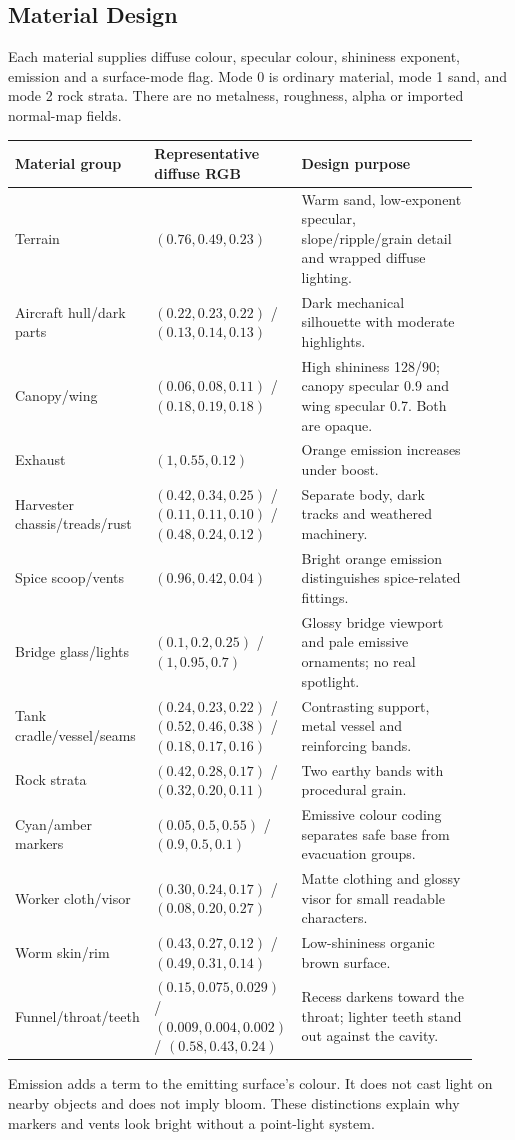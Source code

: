 \subsection{Material Design}
Each material supplies diffuse colour, specular colour, shininess exponent, emission and a surface-mode flag. Mode 0 is ordinary material, mode 1 sand, and mode 2 rock strata. There are no metalness, roughness, alpha or imported normal-map fields.
\begin{longtable}{L{0.28\linewidth}L{0.26\linewidth}L{0.38\linewidth}}
\toprule\textbf{Material group}&\textbf{Representative diffuse RGB}&\textbf{Design purpose}\\\midrule\endhead
Terrain & $(0.76,0.49,0.23)$ & Warm sand, low-exponent specular, slope/ripple/grain detail and wrapped diffuse lighting.\\
Aircraft hull/dark parts & $(0.22,0.23,0.22)$ / $(0.13,0.14,0.13)$ & Dark mechanical silhouette with moderate highlights.\\
Canopy/wing & $(0.06,0.08,0.11)$ / $(0.18,0.19,0.18)$ & High shininess 128/90; canopy specular 0.9 and wing specular 0.7. Both are opaque.\\
Exhaust & $(1,0.55,0.12)$ & Orange emission increases under boost.\\
Harvester chassis/treads/rust & $(0.42,0.34,0.25)$ / $(0.11,0.11,0.10)$ / $(0.48,0.24,0.12)$ & Separate body, dark tracks and weathered machinery.\\
Spice scoop/vents & $(0.96,0.42,0.04)$ & Bright orange emission distinguishes spice-related fittings.\\
Bridge glass/lights & $(0.1,0.2,0.25)$ / $(1,0.95,0.7)$ & Glossy bridge viewport and pale emissive ornaments; no real spotlight.\\
Tank cradle/vessel/seams & $(0.24,0.23,0.22)$ / $(0.52,0.46,0.38)$ / $(0.18,0.17,0.16)$ & Contrasting support, metal vessel and reinforcing bands.\\
Rock strata & $(0.42,0.28,0.17)$ / $(0.32,0.20,0.11)$ & Two earthy bands with procedural grain.\\
Cyan/amber markers & $(0.05,0.5,0.55)$ / $(0.9,0.5,0.1)$ & Emissive colour coding separates safe base from evacuation groups.\\
Worker cloth/visor & $(0.30,0.24,0.17)$ / $(0.08,0.20,0.27)$ & Matte clothing and glossy visor for small readable characters.\\
Worm skin/rim & $(0.43,0.27,0.12)$ / $(0.49,0.31,0.14)$ & Low-shininess organic brown surface.\\
Funnel/throat/teeth & $(0.15,0.075,0.029)$ / $(0.009,0.004,0.002)$ / $(0.58,0.43,0.24)$ & Recess darkens toward the throat; lighter teeth stand out against the cavity.\\
\bottomrule
\end{longtable}
Emission adds a term to the emitting surface's colour. It does not cast light on nearby objects and does not imply bloom. These distinctions explain why markers and vents look bright without a point-light system.

